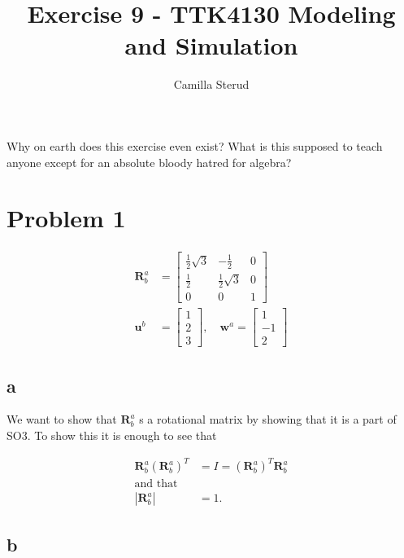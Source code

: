 \documentclass{article}
\title{Exercise 9 - TTK4130 Modeling and Simulation}
\author{Camilla Sterud}
\date{}
\begin{document}
\maketitle

\newpage

Why on earth does this exercise even exist? What is this supposed to teach anyone except for an absolute bloody hatred for algebra?

\section{Problem 1}

\begin{align*}
    \mathbf{R}_b^a &= 
    \begin{bmatrix}
        \frac{1}{2} \sqrt{3} & -\frac{1}{2} & 0 \\
        \frac{1}{2} & \frac{1}{2} \sqrt{3} & 0 \\
        0 & 0 & 1
    \end{bmatrix}\\
    \mathbf{u}^b &= 
    \begin{bmatrix}
    1\\
    2 \\
    3
    \end{bmatrix},
    \quad 
    \mathbf{w}^a = 
    \begin{bmatrix}
    1\\
    -1 \\
    2
    \end{bmatrix}
\end{align*}



\subsection{a}

We want to show that $\mathbf{R}_b^a$ s a rotational matrix by showing that it is a part of SO3. To show this it is enough to see that 

\begin{align*}
     \mathbf{R}_b^a(\mathbf{R}_b^a)^T &= I =  (\mathbf{R}_b^a)^T\mathbf{R}_b^a\\
     \text{and that}\\
     |\mathbf{R}_b^a| &= 1. 
\end{align*}

\subsection{b}
\end{document}
